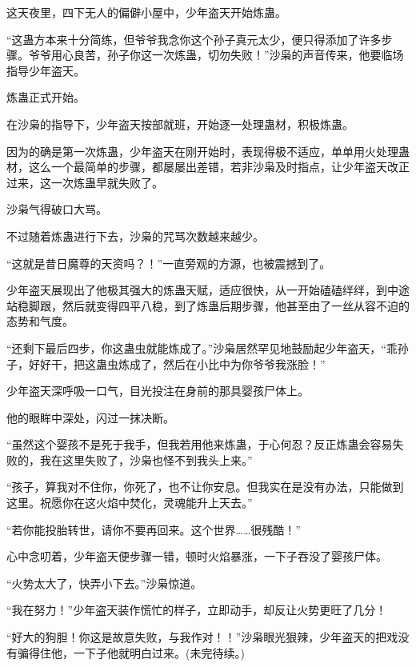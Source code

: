 \begin{this_body}
这天夜里，四下无人的偏僻小屋中，少年盗天开始炼蛊。

“这蛊方本来十分简练，但爷爷我念你这个孙子真元太少，便只得添加了许多步骤。爷爷用心良苦，孙子你这一次炼蛊，切勿失败！”沙枭的声音传来，他要临场指导少年盗天。

炼蛊正式开始。

在沙枭的指导下，少年盗天按部就班，开始逐一处理蛊材，积极炼蛊。

因为的确是第一次炼蛊，少年盗天在刚开始时，表现得极不适应，单单用火处理蛊材，这么一个最简单的步骤，都屡屡出差错，若非沙枭及时指点，让少年盗天改正过来，这一次炼蛊早就失败了。

沙枭气得破口大骂。

不过随着炼蛊进行下去，沙枭的咒骂次数越来越少。

“这就是昔日魔尊的天资吗？！”一直旁观的方源，也被震撼到了。

少年盗天展现出了他极其强大的炼蛊天赋，适应很快，从一开始磕磕绊绊，到中途站稳脚跟，然后就变得四平八稳，到了炼蛊后期步骤，他甚至由了一丝从容不迫的态势和气度。

“还剩下最后四步，你这蛊虫就能炼成了。”沙枭居然罕见地鼓励起少年盗天，“乖孙子，好好干，把这蛊虫炼成了，然后在小比中为你爷爷我涨脸！”

少年盗天深呼吸一口气，目光投注在身前的那具婴孩尸体上。

他的眼眸中深处，闪过一抹决断。

“虽然这个婴孩不是死于我手，但我若用他来炼蛊，于心何忍？反正炼蛊会容易失败的，我在这里失败了，沙枭也怪不到我头上来。”

“孩子，算我对不住你，你死了，也不让你安息。但我实在是没有办法，只能做到这里。祝愿你在这火焰中焚化，灵魂能升上天去。”

“若你能投胎转世，请你不要再回来。这个世界……很残酷！”

心中念叨着，少年盗天便步骤一错，顿时火焰暴涨，一下子吞没了婴孩尸体。

“火势太大了，快弄小下去。”沙枭惊道。

“我在努力！”少年盗天装作慌忙的样子，立即动手，却反让火势更旺了几分！

“好大的狗胆！你这是故意失败，与我作对！！”沙枭眼光狠辣，少年盗天的把戏没有骗得住他，一下子他就明白过来。(未完待续。)

\end{this_body}


